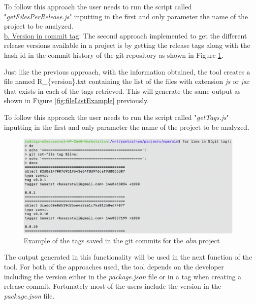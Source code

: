 To follow this approach the user needs to run the script called "\textit{getFilesPerRelease.js}" inputting in the first and only parameter the name of the project to be analyzed. \\

\underline{b. Version in commit tag}:
The second approach implemented to get the different release versions available in a project is by getting the release tags along with the hash id in the commit history of the git repository as shown in Figure \ref{fig:tagExample}.

Just like the previous approach, with the information obtained, the tool creates a file named R\_\{version\}.txt containing the list of the files with extension \textit{js} or \textit{jsx} that exists in each of the tags retrieved. 
This will generate the same output as shown in Figure \ref{fig:fileListExample} previously.

To follow this approach the user needs to run the script called "\textit{getTags.js}" inputting in the first and only parameter the name of the project to be analyzed. 

\begin{figure}[ht!]
\centering
\includegraphics[width=1\textwidth]{images/tag_example2.png}
\caption{Example of the tags saved in the git commits for the \textit{alm} project}
\label{fig:tagExample}
\end{figure}

The output generated in this functionality will be used in the next function of the tool. For both of the approaches used, the tool depends on the developer including the version either in the \textit{package.json} file or in a tag when creating a release commit. Fortunately most of the users include the version in the \textit{package.json} file.\\

